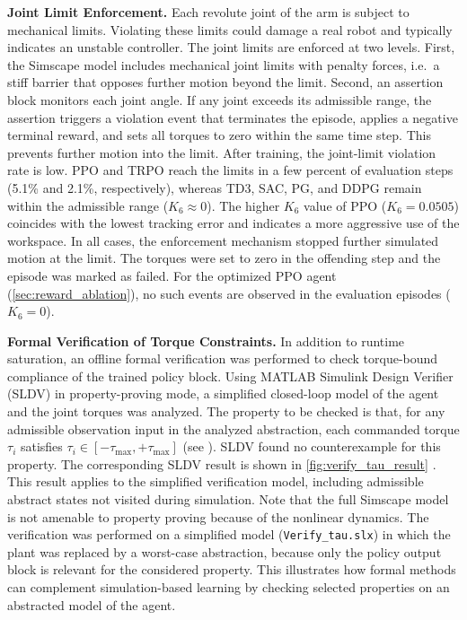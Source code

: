 \documentclass{ieeeaccess}
\begin{document}
\textbf{Joint Limit Enforcement.} Each revolute joint of the arm is subject to mechanical limits.
Violating these limits could damage a real robot and typically indicates an unstable controller.
The joint limits are enforced at two levels. First, the Simscape model includes mechanical
joint limits with penalty forces, i.e.\ a stiff barrier that opposes further motion beyond the
limit. Second, an assertion block monitors each joint angle. If any joint exceeds its
admissible range, the assertion triggers a violation event that terminates the episode, applies a
negative terminal reward, and sets all torques to zero within the same time step.
This prevents further motion into the limit. After training, the joint-limit violation rate is
low. PPO and TRPO reach the limits in a few percent of evaluation steps
(5.1\% and 2.1\%, respectively), whereas TD3, SAC, PG, and DDPG remain within the admissible
range ($K_6 \approx 0$). The higher $K_6$ value of PPO ($K_6 = 0.0505$) coincides
with the lowest tracking error and indicates a more aggressive use of the workspace.
In all cases, the enforcement mechanism stopped further simulated motion at the limit. The
torques were set to zero in the offending step and the episode was marked
as failed. For the optimized PPO agent (\autoref{sec:reward_ablation}), no such events are observed in
the evaluation episodes ($K_6 = 0$).

\textbf{Formal Verification of Torque Constraints.} In addition to runtime saturation, an offline formal verification
was performed to check torque-bound compliance of the trained policy block. Using MATLAB Simulink
Design Verifier (SLDV) in property-proving mode,
a simplified closed-loop model of the agent and the joint torques was analyzed. The
property to be checked is that, for any admissible observation input in the analyzed
abstraction, each commanded torque $\tau_i$ satisfies $\tau_i \in [-\tau_{\max}, +\tau_{\max}]$ (see ). SLDV found
no counterexample for this property. The corresponding SLDV result is shown in \autoref{fig:verify_tau_result} \cite{b5}.
This result applies to the simplified verification model, including admissible abstract states not visited
during simulation. Note that the full Simscape model is not amenable to property proving
because of the nonlinear dynamics. The verification was performed on a simplified model (\texttt{Verify\_tau.slx})
in which the plant was replaced by a worst-case abstraction, because only the policy
output block is relevant for the considered property. This illustrates how formal methods can
complement simulation-based learning by checking selected properties on an abstracted model of the agent.
\end{document}
